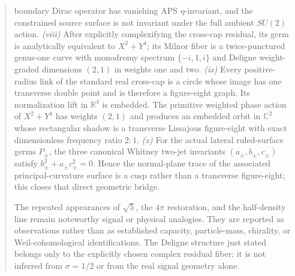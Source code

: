 \documentclass[11pt]{article}
\begin{document}
\begin{abstract}
boundary Dirac operator has vanishing APS $\eta$-invariant, and the constrained
source surface is not invariant under the full ambient $SU(2)$ action.
\emph{(viii)} After explicitly complexifying the cross-cap residual, its germ
is analytically equivalent to $X^2+Y^4$; its Milnor fiber is a twice-punctured
genus-one curve with monodromy spectrum $\{-i,1,i\}$ and Deligne weight-graded
dimensions $(2,1)$ in weights one and two.
\emph{(ix)} Every positive-radius link of the standard real cross-cap is a
circle whose image has one transverse double point and is therefore a
figure-eight graph.  Its normalization lift in $\mathbb R^4$ is embedded.  The
primitive weighted phase action of $X^2+Y^4$ has weights $(2,1)$ and produces
an embedded orbit in $\mathbb C^2$ whose rectangular shadow is a transverse
Lissajous figure-eight with exact dimensionless frequency ratio $2:1$.
\emph{(x)} For the actual lateral ruled-surface germs $P_\pm$, the three
canonical Whitney two-jet invariants $(a_\pm,b_\pm,c_\pm)$ satisfy
$b_\pm^2+a_\pm c_\pm^2=0$.  Hence the normal-plane trace of the associated
principal-curvature surface is a cusp rather than a transverse figure-eight;
this closes that direct geometric bridge.

The repeated appearances of $\sqrt5$, the $4\pi$ restoration, and the
half-density line remain noteworthy signal or physical analogies.  They are
reported as observations rather than as established capacity, particle-mass,
chirality, or Weil-cohomological identifications.  The Deligne structure just
stated belongs only to the explicitly chosen complex residual fiber; it is not
inferred from $\sigma=1/2$ or from the real signal geometry alone.
\end{abstract}

\end{document}
